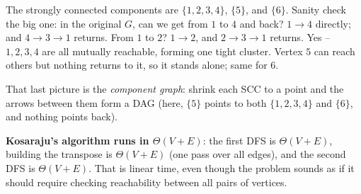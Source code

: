 The strongly connected components are $\{1,2,3,4\}$, $\{5\}$, and $\{6\}$. Sanity
check the big one: in the original $G$, can we get from $1$ to $4$ and back?
$1\to4$ directly; and $4\to3\to1$ returns. From $1$ to $2$? $1\to2$, and
$2\to3\to1$ returns. Yes -- $1,2,3,4$ are all mutually reachable, forming one
tight cluster. Vertex $5$ can reach others but nothing returns to it, so it
stands alone; same for $6$.

\begin{center}
\end{center}

That last picture is the \emph{component graph}: shrink each SCC to a point and
the arrows between them form a DAG (here, $\{5\}$ points to both $\{1,2,3,4\}$
and $\{6\}$, and nothing points back).

\begin{complexitybox}
\textbf{Kosaraju's algorithm runs in $\Theta(V + E)$}: the first DFS is
$\Theta(V+E)$, building the transpose is $\Theta(V+E)$ (one pass over all edges),
and the second DFS is $\Theta(V+E)$. That is linear time, even though the
problem sounds as if it should require checking reachability between all
pairs of vertices.
\end{complexitybox}

